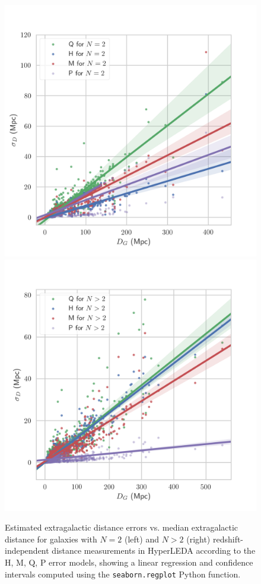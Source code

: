 \documentclass[a4paper,fleqn,usenatbib]{mnras}
\begin{document}
\begin{figure}
	\includegraphics[scale=0.69]{f26HLlow.png}
	\includegraphics[scale=0.69]{f27HLhigh.png}
    \caption{Estimated extragalactic distance errors vs. median extragalactic distance for galaxies with $N=2$ (left) and $N>2$ (right) redshift-independent distance measurements in HyperLEDA according to the H, M, Q, P error models, showing a linear regression and confidence intervals computed using the \texttt{seaborn.regplot} Python function.}
    \label{fig:HLlow}
\end{figure}
\end{document}

